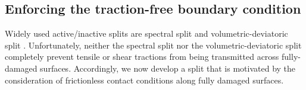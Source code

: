 \subsection{Enforcing the traction-free boundary condition}
\label{section: Chapter4/theory/contact_split}

Widely used active/inactive splits are spectral split \cite{miehe_2010_p1, miehe_2010_p2} and volumetric-deviatoric split \cite{amor_2009}.  Unfortunately, neither the spectral split nor the volumetric-deviatoric split completely prevent tensile or shear tractions from being transmitted across fully-damaged surfaces.  Accordingly, we now develop a split that is motivated by the consideration of frictionless contact conditions along fully damaged surfaces.

